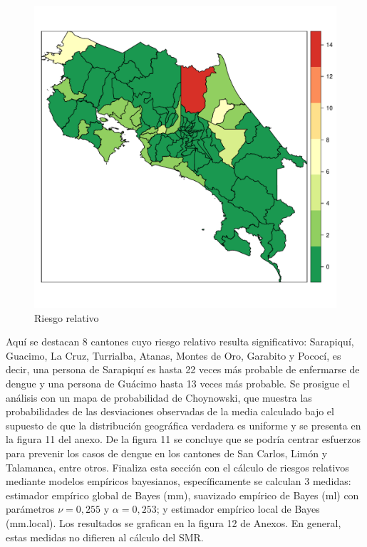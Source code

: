 \documentclass[12pt,a4paper]{article}
\begin{document}
\begin{figure}[hbtp]
\centering
\includegraphics[scale=0.75]{F5.pdf}
\caption{Riesgo relativo}
\end{figure}

Aquí se destacan 8 cantones cuyo riesgo relativo resulta significativo: Sarapiquí, Guacimo, La Cruz, Turrialba, Atanas, Montes de Oro, Garabito y Pococí, es decir, una persona de Sarapiquí es hasta 22 veces más probable de enfermarse de dengue y una persona de Guácimo hasta 13 veces más probable. Se prosigue el análisis con un mapa de probabilidad de Choynowski, que muestra las probabilidades de las desviaciones observadas de la media calculado bajo el supuesto de que la distribución geográfica verdadera es uniforme y se presenta en la figura 11 del anexo. De la figura 11 se concluye que se podría centrar esfuerzos para prevenir los casos de dengue en los cantones de San Carlos, Limón y Talamanca, entre otros.
\newline
Finaliza esta sección con el cálculo de riesgos relativos mediante modelos empíricos bayesianos, específicamente se calculan 3 medidas: estimador empírico global de Bayes (mm), suavizado empírico de Bayes (ml) con parámetros $\nu = 0,255$ y $\alpha = 0,253$; y estimador empírico local de Bayes (mm.local). Los resultados se grafican en la figura 12 de Anexos. En general, estas medidas no difieren al cálculo del SMR.
\end{document}
